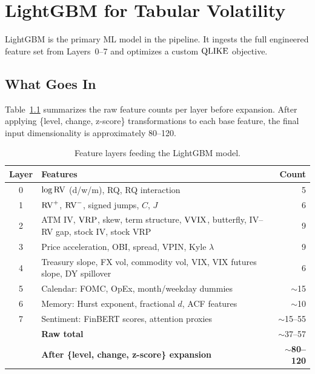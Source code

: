 \chapter{LightGBM for Tabular Volatility}
\label{ch:lightgbm}

LightGBM \citep{Ke2017} is the primary ML model in the pipeline.
It ingests the full engineered feature set from Layers~0--7 and optimizes a custom $\operatorname{QLIKE}$ objective.

\section{What Goes In}
\label{sec:lgbm-features}

Table~\ref{tab:feature-layers} summarizes the raw feature counts per layer before expansion.
After applying \{level, change, z-score\} transformations to each base feature, the final input dimensionality is approximately 80--120.

\begin{table}[htbp]
\centering
\caption{Feature layers feeding the LightGBM model.}
\label{tab:feature-layers}
\small
\begin{tabular}{@{}clr@{}}
\toprule
\textbf{Layer} & \textbf{Features} & \textbf{Count} \\
\midrule
0 & $\log \operatorname{RV}$ (d/w/m), RQ, RQ interaction  & 5 \\
1 & $\operatorname{RV}^+$, $\operatorname{RV}^-$, signed jumps, $C$, $J$ & 6 \\
2 & ATM IV, $\operatorname{VRP}$, skew, term structure, $\operatorname{VVIX}$, butterfly, IV--RV gap, stock IV, stock VRP & 9 \\
3 & Price acceleration, OBI, spread, VPIN, Kyle $\lambda$ & 9 \\
4 & Treasury slope, FX vol, commodity vol, VIX, VIX futures slope, DY spillover & 6 \\
5 & Calendar: FOMC, OpEx, month/weekday dummies & $\sim$15 \\
6 & Memory: Hurst exponent, fractional $d$, ACF features & $\sim$10 \\
7 & Sentiment: FinBERT scores, attention proxies & $\sim$15--55 \\
\midrule
  & \textbf{Raw total} & $\sim$37--57 \\
  & \textbf{After \{level, change, z-score\} expansion} & $\sim$\textbf{80--120} \\
\bottomrule
\end{tabular}
\end{table}


